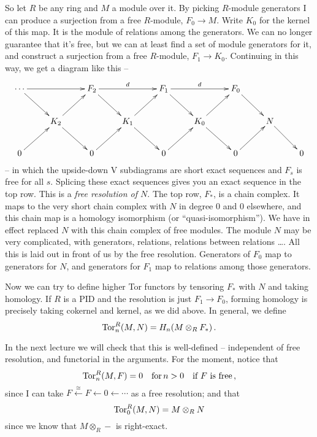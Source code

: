 So let $R$ be any ring and $M$ a module over it. By picking $R$-module
generators I can produce a surjection from a free $R$-module, $F_0\to M$.
Write $K_0$ for the kernel of this map. It is the module of relations among
the generators. We can no longer guarantee that it's free, but we can at 
least find a set of module generators for it, and construct a surjection
from a free $R$-module, $F_1\to K_0$. Continuing in this way, we get a 
diagram like this -- 
\begin{equation*}
\xymatrix{\cdots\ar[rr]\ar[dr] && F_2\ar[dr]\ar[rr]^d & & 
F_1\ar[dr]\ar[rr]^d & & F_0\ar[dr]\\
& K_2\ar[ur]\ar[dr] & & K_1\ar[ur]\ar[dr] & & K_0\ar[ur]\ar[dr] & & N\ar[dr]\\
0\ar[ur] & & 0\ar[ur] & & 0\ar[ur] & & 0\ar[ur] & & 0}
\end{equation*}
-- in which the upside-down V subdiagrams are short exact sequences
and $F_s$ is free for all $s$. Splicing these exact sequences gives you an 
exact sequence in the top row. This is a \emph{free resolution of $N$}.
The top row, $F_*$, is a chain complex. It maps to the very short chain
complex with $N$ in degree 0 and 0 elsewhere, and this chain map is a 
homology isomorphism (or ``quasi-isomorphism''). We have in effect replaced
$N$ with this chain complex of free modules. The module $N$ may be very
complicated, with generators, relations, relations between relations \ldots.
All this is laid out in front of us by the free resolution. Generators of $F_0$
map to generators for $N$, and generators for $F_1$ map to relations among
those generators. 

Now we can try to define higher Tor functors by tensoring $F_*$ with $N$
and taking homology. If $R$ is a PID and the resolution is just $F_1\to F_0$,
forming homology is precisely taking cokernel and kernel, as we did above. 
In general, we define
\[
\operatorname{Tor}^R_n(M,N)=H_n(M\otimes_R F_\ast)\,.
\]

In the next lecture we will check that this is well-defined -- independent 
of free resolution, and functorial in the arguments. For the moment, notice 
that \[
\operatorname{Tor}^R_n(M,F)=0\quad\hbox{for}\, n>0 \quad\hbox{if $F$ is free}\,,
\]
since I can take $F\xleftarrow{\cong}F\leftarrow0\leftarrow\cdots$ as a
free resolution; and that 
\[
\operatorname{Tor}^R_0(M,N)=M\otimes_RN
\]
since we know that $M\otimes_R-$ is right-exact.


